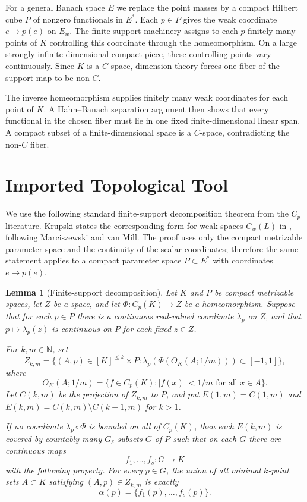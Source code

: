 \documentclass[11pt]{article}
\newtheorem{lemma}{Lemma}
\begin{document}
For a general Banach space $E$ we replace the point masses by a compact
Hilbert cube $P$ of nonzero functionals in $E^*$. Each $p\in P$ gives the
weak coordinate $e\mapsto p(e)$ on $E_w$. The finite-support machinery
assigns to each $p$ finitely many points of $K$ controlling this coordinate
through the homeomorphism. On a large strongly infinite-dimensional compact
piece, these controlling points vary continuously. Since $K$ is a $C$-space,
dimension theory forces one fiber of the support map to be non-$C$.

The inverse homeomorphism supplies finitely many weak coordinates for each
point of $K$. A Hahn--Banach separation argument then shows that every
functional in the chosen fiber must lie in one fixed finite-dimensional
linear span. A compact subset of a finite-dimensional space is a $C$-space,
contradicting the non-$C$ fiber.

\section*{Imported Topological Tool}

We use the following standard finite-support decomposition theorem from the
$C_p$ literature. Krupski states the corresponding form for weak spaces
$C_w(L)$ in \cite[Theorem 1 and Lemma 1]{KrupskiWeakPointwise}, following
Marciszewski and van Mill. The proof uses only the compact metrizable
parameter space and the continuity of the scalar coordinates; therefore the
same statement applies to a compact parameter space $P\subset E^*$ with
coordinates $e\mapsto p(e)$.

\begin{lemma}[Finite-support decomposition]\label{lem:finite-support}
Let $K$ and $P$ be compact metrizable spaces, let $Z$ be a space, and let
$\Phi:C_p(K)\to Z$ be a homeomorphism. Suppose that for each $p\in P$ there
is a continuous real-valued coordinate $\lambda_p$ on $Z$, and that
$p\mapsto \lambda_p(z)$ is continuous on $P$ for each fixed $z\in Z$.

For $k,m\in\mathbb N$, set
\[
  Z_{k,m}=\{(A,p)\in [K]^{\le k}\times P:
  \lambda_p(\Phi(O_K(A;1/m)))\subset [-1,1]\},
\]
where
\[
  O_K(A;1/m)=\{f\in C_p(K): |f(x)|<1/m \text{ for all }x\in A\}.
\]
Let $C(k,m)$ be the projection of $Z_{k,m}$ to $P$, and put
$E(1,m)=C(1,m)$ and $E(k,m)=C(k,m)\setminus C(k-1,m)$ for $k>1$.

If no coordinate $\lambda_p\circ\Phi$ is bounded on all of $C_p(K)$, then
each $E(k,m)$ is covered by countably many $G_\delta$ subsets $G$ of $P$
such that on each $G$ there are continuous maps
\[
  f_1,\ldots,f_s:G\to K
\]
with the following property. For every $p\in G$, the union of all
minimal $k$-point sets $A\subset K$ satisfying $(A,p)\in Z_{k,m}$ is exactly
\[
  \alpha(p)=\{f_1(p),\ldots,f_s(p)\}.
\]
\end{lemma}
\end{document}

